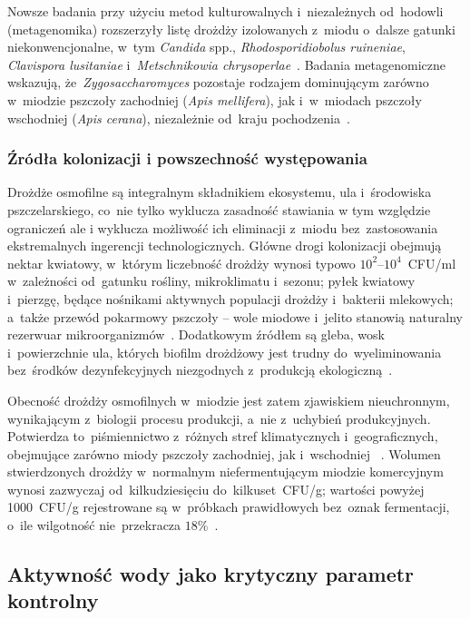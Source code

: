 Nowsze badania przy użyciu metod kulturowalnych i~niezależnych
od~hodowli (metagenomika) rozszerzyły listę drożdży izolowanych
z~miodu o~dalsze gatunki niekonwencjonalne, w~tym \textit{Candida} spp.,
\textit{Rhodosporidiobolus ruineniae}, \textit{Clavispora lusitaniae}
i~\textit{Metschnikowia chrysoperlae}~\cite{rodriguezmachado2024}.
Badania metagenomiczne wskazują, że~\textit{Zygosaccharomyces} pozostaje
rodzajem dominującym zarówno w~miodzie pszczoły zachodniej
(\textit{Apis mellifera}), jak i~w~miodach pszczoły wschodniej (\textit{Apis cerana}),
niezależnie od~kraju pochodzenia~\cite{yeastbiodiversity2025}.

\subsubsection{Źródła kolonizacji i powszechność występowania}
Drożdże osmofilne są integralnym składnikiem ekosystemu, ula i środowiska pszczelarskiego, co nie tylko wyklucza zasadność stawiania w tym względzie ograniczeń ale i wyklucza możliwość ich eliminacji z miodu bez zastosowania ekstremalnych ingerencji technologicznych. Główne drogi kolonizacji obejmują nektar kwiatowy, w którym liczebność drożdży wynosi typowo $10^2$--$10^4$~CFU/ml w~zależności
od~gatunku rośliny, mikroklimatu i~sezonu; pyłek kwiatowy i~pierzgę, będące
nośnikami aktywnych populacji drożdży i~bakterii mlekowych;
a~także przewód pokarmowy pszczoły -- wole miodowe i~jelito
stanowią naturalny rezerwuar mikroorganizmów~\cite{alwaili2012}.
Dodatkowym źródłem są gleba, wosk i~powierzchnie ula, których
biofilm drożdżowy jest trudny do~wyeliminowania bez~środków
dezynfekcyjnych niezgodnych z~produkcją ekologiczną~\cite{alwaili2012}.

Obecność drożdży osmofilnych w~miodzie jest zatem zjawiskiem
nieuchronnym, wynikającym z~biologii procesu produkcji,
a~nie z~uchybień produkcyjnych. Potwierdza to~piśmiennictwo
z~różnych stref klimatycznych i~geograficznych, obejmujące
zarówno miody pszczoły zachodniej, jak i~wschodniej ~\cite{yeastbiodiversity2025}.
Wolumen stwierdzonych drożdży w~normalnym niefermentującym miodzie
komercyjnym wynosi zazwyczaj od~kilkudziesięciu do~kilkuset~CFU/g;
wartości powyżej 1000~CFU/g rejestrowane są w~próbkach prawidłowych
bez~oznak fermentacji, o~ile wilgotność nie~przekracza
$18\%$~\cite{analytica2020}.


\subsection{Aktywność wody jako krytyczny parametr kontrolny}

